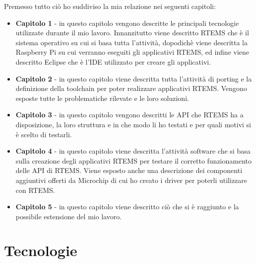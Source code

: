 \documentclass[12pt, a4paper, titlepage, oneside]{book}
\begin{document}
\begin{flushleft}
Premesso tutto ciò ho suddiviso la mia relazione nei seguenti capitoli:

\begin{itemize}
    \item \textbf{Capitolo 1} - in questo capitolo vengono descritte le principali tecnologie utilizzate durante il mio lavoro. Innanzitutto viene descritto RTEMS che è il sistema operativo su cui si basa tutta l'attività, dopodichè viene  descritta la Raspberry Pi su cui verranno eseguiti gli applicativi RTEMS, ed infine viene descritto Eclipse che è l'IDE utilizzato per creare gli applicativi.
    \item \textbf{Capitolo 2} - in questo capitolo viene descritta tutta l'attività di porting e la definizione della toolchain per poter realizzare applicativi RTEMS. Vengono esposte tutte le problematiche rilevate e le loro soluzioni. 
    \item \textbf{Capitolo 3} - in questo capitolo vengono descritti le API che RTEMS ha a disposizione, la loro struttura e in che modo li ho testati e per quali motivi si è scelto di testarli.
    \item \textbf{Capitolo 4} - in questo capitolo viene descritta l'attività software che si basa sulla creazione degli applicativi RTEMS per testare il corretto funzionamento delle API di RTEMS. Viene esposto anche una descrizione dei componenti aggiuntivi offerti da Microchip di cui ho creato i driver per poterli utilizzare con RTEMS.
    \item \textbf{Capitolo 5} - in questo capitolo viene descritto ciò che si è raggiunto e la possibile estensione del mio lavoro.
\end{itemize} 
\chapter{Tecnologie}


\end{flushleft}
\end{document}
